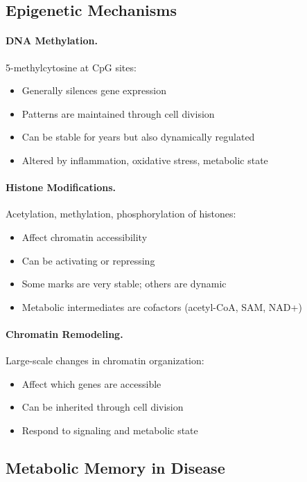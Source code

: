 \subsection{Epigenetic Mechanisms}

\paragraph{DNA Methylation.} 5-methylcytosine at CpG sites:
\begin{itemize}
    \item Generally silences gene expression
    \item Patterns are maintained through cell division
    \item Can be stable for years but also dynamically regulated
    \item Altered by inflammation, oxidative stress, metabolic state
\end{itemize}

\paragraph{Histone Modifications.} Acetylation, methylation, phosphorylation of histones:
\begin{itemize}
    \item Affect chromatin accessibility
    \item Can be activating or repressing
    \item Some marks are very stable; others are dynamic
    \item Metabolic intermediates are cofactors (acetyl-CoA, SAM, NAD+)
\end{itemize}

\paragraph{Chromatin Remodeling.} Large-scale changes in chromatin organization:
\begin{itemize}
    \item Affect which genes are accessible
    \item Can be inherited through cell division
    \item Respond to signaling and metabolic state
\end{itemize}

\subsection{Metabolic Memory in Disease}

